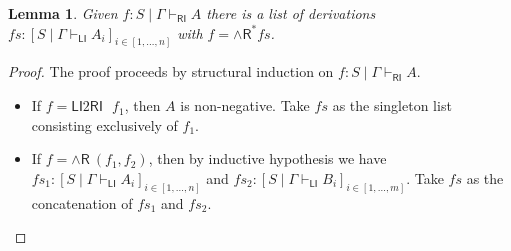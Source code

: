 \documentclass[submission,copyright,creativecommons]{eptcs}
\newtheorem{lemma}[theorem]{Lemma}
\theoremstyle{definition}
\newcommand{\andr}{\land \mathsf{R}}
\newcommand{\RI}{\mathsf{RI}}
\newcommand{\LI}{\mathsf{LI}}
\newcommand\niccolo[1]{\mbox{}
{\marginpar{\color{red}NV}}
{\sf\noindent\color{red}#1}}%
\begin{document}
\begin{lemma}\label{lem:RI:invert}
  Given $f : S \mid \Gamma \vdash_{\RI} A$ there is a list of derivations $fs : [S \mid \Gamma \vdash_{\LI} A_i]_{i \in [1 , \dots , n]}$ with $f = \andr^{*} fs$.
\end{lemma}
\begin{proof}
  The proof proceeds by structural induction on $f : S \mid \Gamma \vdash_{\RI} A$.
  \begin{itemize}
    \item If $f = \LI2 \RI \text{ } f_1$, then $A$ is non-negative. Take $fs$ as the singleton list consisting exclusively of $f_1$.
    \item If $f = \andr \ (f_1, f_2)$, then by inductive hypothesis we have $fs_1 : [S \mid \Gamma \vdash_{\LI} A_i]_{i \in [1 , \dots , n]}$ and $fs_2 : [S \mid \Gamma \vdash_{\LI} B_i]_{i \in [1 , \dots , m]}$. Take $fs$ as the concatenation of $fs_1$ and $fs_2$.
  \end{itemize}
\end{proof}
\end{document}
